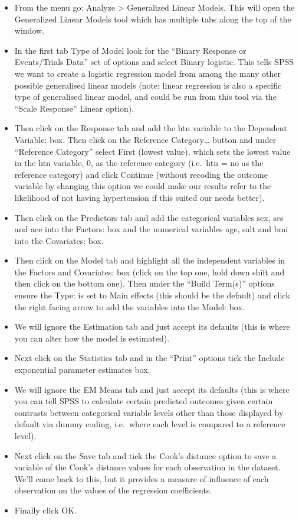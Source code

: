 \documentclass[
]{book}
\begin{document}
\begin{itemize}
\item
  From the menu go: Analyze \textgreater{} Generalized Linear Models. This will open the Generalized Linear Models tool which has multiple tabs along the top of the window.
\item
  In the first tab Type of Model look for the ``Binary Response or Events/Trials Data'' set of options and select Binary logistic. This tells SPSS we want to create a logistic regression model from among the many other possible generalised linear models (note: linear regression is also a specific type of generalised linear model, and could be run from this tool via the ``Scale Response'' Linear option).
\item
  Then click on the Response tab and add the htn variable to the Dependent Variable: box. Then click on the Reference Category\ldots{} button and under ``Reference Category'' select First (lowest value), which sets the lowest value in the htn variable, 0, as the reference category (i.e.~htn = no as the reference category) and click Continue (without recoding the outcome variable by changing this option we could make our results refer to the likelihood of not having hypertension if this suited our needs better).
\item
  Then click on the Predictors tab and add the categorical variables sex, ses and ace into the Factors: box and the numerical variables age, salt and bmi into the Covariates: box.
\item
  Then click on the Model tab and highlight all the independent variables in the Factors and Covariates: box (click on the top one, hold down shift and then click on the bottom one). Then under the ``Build Term(s)'' options ensure the Type: is set to Main effects (this should be the default) and click the right facing arrow to add the variables into the Model: box.
\item
  We will ignore the Estimation tab and just accept its defaults (this is where you can alter how the model is estimated).
\item
  Next click on the Statistics tab and in the ``Print'' options tick the Include exponential parameter estimates box.
\item
  We will ignore the EM Means tab and just accept its defaults (this is where you can tell SPSS to calculate certain predicted outcomes given certain contrasts between categorical variable levels other than those displayed by default via dummy coding, i.e.~where each level is compared to a reference level).
\item
  Next click on the Save tab and tick the Cook's distance option to save a variable of the Cook's distance values for each observation in the dataset. We'll come back to this, but it provides a measure of influence of each observation on the values of the regression coefficients.
\item
  Finally click OK.
\end{itemize}
\end{document}
